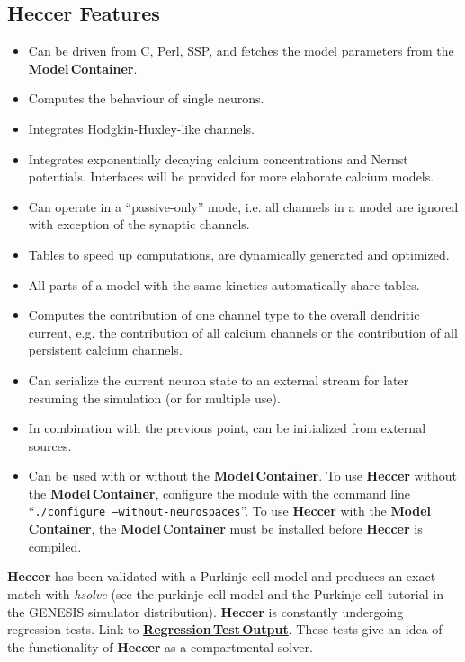 \documentclass[12pt]{article}
\begin{document}
\subsection*{Heccer Features}

\begin{itemize}

\item Can be driven from C, Perl, SSP, and fetches the model parameters from the \href{../model-container/model-container.tex}{\bf Model\,Container}.
\item Computes the behaviour of single neurons.
\item Integrates Hodgkin-Huxley-like channels.
\item Integrates exponentially decaying calcium concentrations and Nernst potentials. Interfaces will be provided for more elaborate calcium models.
\item Can operate in a ``passive-only'' mode, i.e. all channels in a model are ignored with exception of the synaptic channels.
\item Tables to speed up computations, are dynamically generated and optimized.
\item All parts of a model with the same kinetics automatically share tables.
\item Computes the contribution of one channel type to the overall dendritic current, e.g. the contribution of all calcium channels or the contribution of all persistent calcium channels.
\item Can serialize the current neuron state to an external stream for later resuming the simulation (or for multiple use).
\item In combination with the previous point, can be initialized from external sources.
\item Can be used with or without the {\bf Model\,Container}. To use {\bf Heccer} without the {\bf Model\,Container}, configure the module with the command line ``{\tt ./configure --without-neurospaces}''. To use {\bf Heccer} with the {\bf Model\,Container}, the {\bf Model\,Container} must be installed before {\bf Heccer} is compiled. 
\end{itemize}
{\bf Heccer} has been validated with a Purkinje cell model and produces an exact match with {\it hsolve} (see the purkinje cell model and the Purkinje cell tutorial in the GENESIS simulator distribution). {\bf Heccer} is constantly undergoing regression tests. Link to  \href{http://neurospaces.sourceforge.net/neurospaces_project/heccer/tests/html/index.html}{\bf Regression\,Test\,Output}. These tests give an idea of the functionality of {\bf Heccer} as a compartmental solver.
\end{document}
